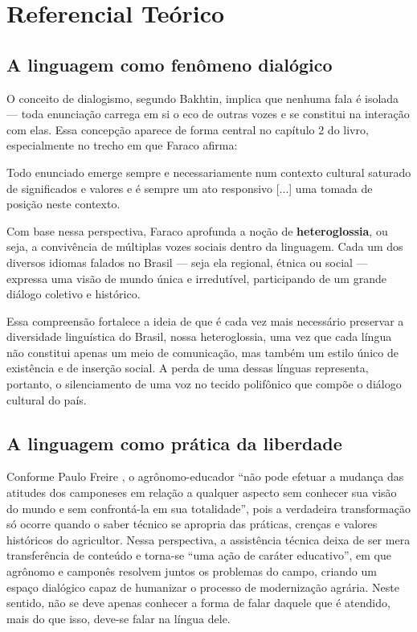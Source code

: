 \chapter{Referencial Teórico}

\section{A linguagem como fenômeno dialógico}
O conceito de dialogismo, segundo Bakhtin, implica que nenhuma fala é isolada — toda enunciação carrega em si o eco de outras vozes e se constitui na interação com elas. Essa concepção aparece de forma central no capítulo 2 do livro, especialmente no trecho em que Faraco afirma:

\begin{citacao}
Todo enunciado emerge sempre e necessariamente num contexto cultural saturado de significados e valores e é sempre um ato responsivo [...] uma tomada de posição neste contexto.
\cite[p. 126]{faraco2009}
\end{citacao}

Com base nessa perspectiva, Faraco aprofunda a noção de \textbf{heteroglossia}, ou seja, a convivência de múltiplas vozes sociais dentro da linguagem. Cada um dos diversos idiomas falados no Brasil — seja ela regional, étnica ou social — expressa uma visão de mundo única e irredutível, participando de um grande diálogo coletivo e histórico.

Essa compreensão fortalece a ideia de que é cada vez mais necessário preservar a diversidade linguística do Brasil, nossa heteroglossia, uma vez que cada língua não constitui apenas um meio de comunicação, mas também um estilo único de existência e de inserção social. A perda de uma dessas línguas representa, portanto, o silenciamento de uma voz no tecido polifônico que compõe o diálogo cultural do país.





\section{A linguagem como prática da liberdade}

Conforme Paulo Freire \cite{freire2013extensao}, o agrônomo-educador “não pode efetuar a mudança das atitudes dos camponeses em relação a qualquer aspecto sem conhecer sua visão do mundo e sem confrontá-la em sua totalidade”, pois a verdadeira transformação só ocorre quando o saber técnico se apropria das práticas, crenças e valores históricos do agricultor. Nessa perspectiva, a assistência técnica deixa de ser mera transferência de conteúdo e torna-se “uma ação de caráter educativo”, em que agrônomo e camponês resolvem juntos os problemas do campo, criando um espaço dialógico capaz de humanizar o processo de modernização agrária.
Neste sentido, não se deve apenas conhecer a forma de falar daquele que é atendido, mais do que isso, deve-se falar na língua dele.


